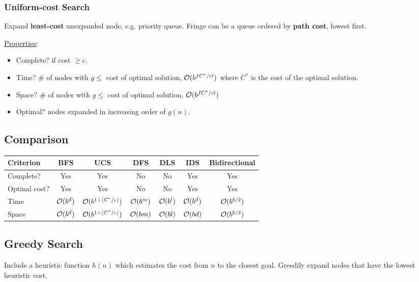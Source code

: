 \documentclass{ainote}
\begin{document}
\subsubsection{Uniform-cost Search}
Expand \textbf{least-cost} unexpanded node, e.g. priority queue. Fringe can be a queue ordered by \textbf{path cost}, lowest first.


\underline{Properties}:
\begin{itemize}
    \item Complete?  if cost $\ge c$.
    \item Time? \# of nodes with $g\le$ cost of optimal solution, $\mathcal{O}(b^{fC^*/cl})$ where $C^*$ is the cost of the optimal solution.
    \item Space? \# of nodes with $g\le$ cost of optimal solution, $\mathcal{O}(b^{fC^*/cl})$
    \item Optimal?  nodes expanded in increasing order of $g(n)$.
\end{itemize}

\subsection{Comparison}
\begin{center}
    \begin{tabular}{|l|c|c|c|c|c|c|}
    \hline
    Criterion&BFS&UCS&DFS&DLS&IDS&Bidirectional \\
    \hline
    Complete?&Yes&Yes&No&No&Yes&Yes\\
    \hline
    Optinal cost?&Yes&Yes&No&No&Yes&Yes\\
    \hline
    Time&$\mathcal{O}(b^d)$&$\mathcal{O}(b^{1+\lfloor C^*/\epsilon\rfloor})$&$\mathcal{O}(b^m)$&$\mathcal{O}(b^l)$&$\mathcal{O}(b^d)$&$\mathcal{O}(b^{b/2})$\\
    \hline
    Space&$\mathcal{O}(b^d)$&$\mathcal{O}(b^{1+\lfloor C^*/\epsilon\rfloor})$&$\mathcal{O}(bm)$&$\mathcal{O}(bl)$&$\mathcal{O}(bd)$&$\mathcal{O}(b^{b/2})$\\
    \hline
    
    \end{tabular}
\end{center}

\subsection{Greedy Search}
Include a heuristic function $h(n)$ which estimates the cost from $n$ to the closest goal. Greedily expand nodes that have the lowest heuristic cost. 
\end{document}
